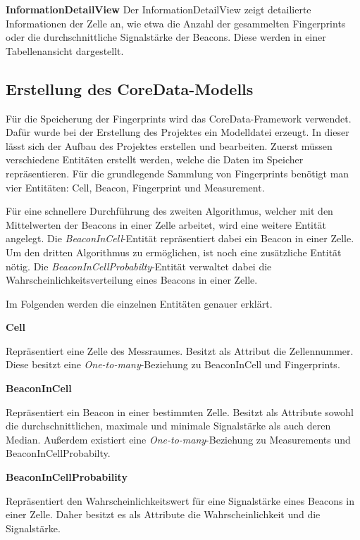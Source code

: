 \textbf{InformationDetailView}
Der InformationDetailView zeigt detailierte Informationen der Zelle an, wie etwa die Anzahl der gesammelten Fingerprints oder die durchschnittliche Signalstärke der Beacons.
Diese werden in einer Tabellenansicht dargestellt.


\subsection{Erstellung des CoreData-Modells}
\label{sec:}
Für die Speicherung der Fingerprints wird das CoreData-Framework verwendet. Dafür wurde bei der Erstellung des Projektes ein Modelldatei erzeugt. In dieser lässt sich der Aufbau des Projektes erstellen und bearbeiten.
Zuerst müssen verschiedene Entitäten erstellt werden, welche die Daten im Speicher repräsentieren.
Für die grundlegende Sammlung von Fingerprints benötigt man vier Entitäten: Cell, Beacon, Fingerprint und Measurement.

Für eine schnellere Durchführung des zweiten Algorithmus, welcher mit den Mittelwerten der Beacons in einer Zelle arbeitet, wird eine weitere Entität angelegt. Die \emph{BeaconInCell}-Entität repräsentiert dabei ein Beacon in einer Zelle.
Um den dritten Algorithmus zu ermöglichen, ist noch eine zusätzliche Entität nötig. Die \emph{BeaconInCellProbabilty}-Entität verwaltet dabei die Wahrscheinlichkeitsverteilung eines Beacons in einer Zelle.

Im Folgenden werden die einzelnen Entitäten genauer erklärt.


\textbf{Cell}

Repräsentiert eine Zelle des Messraumes. Besitzt als Attribut die Zellennummer.
Diese besitzt eine \emph{One-to-many}-Beziehung zu BeaconInCell und Fingerprints.


\textbf{BeaconInCell}

Repräsentiert ein Beacon in einer bestimmten Zelle. Besitzt als Attribute sowohl die durchschnittlichen, maximale und minimale Signalstärke als auch deren Median.
Außerdem existiert eine \emph{One-to-many}-Beziehung zu Measurements und BeaconInCellProbabilty.



\textbf{BeaconInCellProbability}

Repräsentiert den Wahrscheinlichkeitswert für eine Signalstärke eines Beacons in einer Zelle.
Daher besitzt es als Attribute die Wahrscheinlichkeit und die Signalstärke.

